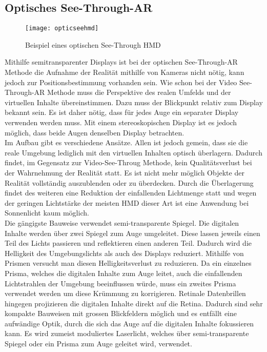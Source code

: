 \subsection*{Optisches See-Through-AR}
\begin{wrapfigure}{r}{0.35\textwidth}
	\vspace{-20pt}
	\begin{center}
		\texttt{[image: opticseehmd]}
	\end{center}
	\vspace{-15pt}
	\captionsetup{width=0.3\textwidth}
	\caption{Beispiel eines optischen See-Through HMD}\label{optseehmd}
	\vspace{-10pt}
\end{wrapfigure}
Mithilfe semitransparenter Displays ist bei der optischen See-Through-AR Methode die Aufnahme der Realität mithilfe von Kameras nicht nötig, kann jedoch zur Positionsbestimmung vorhanden sein. Wie schon bei der Video See-Through-AR Methode muss die Perspektive des realen Umfelds und der virtuellen Inhalte übereinstimmen. Dazu muss der Blickpunkt relativ zum Display bekannt sein. Es ist daher nötig, dass für jedes Auge ein separater Display verwenden werden muss. Mit einem stereoskopischen Display ist es jedoch möglich, dass beide Augen denselben Display betrachten.\cite[S.~248~f.]{doerner13}\\[6pt]
Im Aufbau gibt es verschiedene Ansätze. Allen ist jedoch gemein, dass sie die reale Umgebung lediglich mit den virtuellen Inhalten optisch überlagern. Dadurch findet, im Gegensatz zur Video-See-Throug Methode, kein Qualitätsverlust bei der Wahrnehmung der Realität statt. Es ist nicht mehr möglich Objekte der Realität vollständig auszublenden oder zu überdecken. Durch die Überlagerung findet des weiteren eine Reduktion der einfallenden Lichtmenge statt und wegen der geringen Lichtstärke der meisten HMD dieser Art ist eine Anwendung bei Sonnenlicht kaum möglich.\\[6pt]
Die gängigste Bauweise verwendet semi-transparente Spiegel. Die digitalen Inhalte werden über zwei Spiegel zum Auge umgeleitet. Diese lassen jeweils einen Teil des Lichts passieren und reflektieren einen anderen Teil. Dadurch wird die Helligkeit des Umgebungslichts als auch des Displays reduziert. Mithilfe von Prismen versucht man diesen Helligkeitsverlust zu reduzieren. Da ein einzelnes Prisma, welches die digitalen Inhalte zum Auge leitet, auch die einfallenden Lichtstrahlen der Umgebung beeinflussen würde, muss ein zweites Prisma verwendet werden um diese Krümmung zu korrigieren. Retinale Datenbrillen hingegen projizieren die digitalen Inhalte direkt auf die Retina. Dadurch sind sehr kompakte Bauweisen mit grossen Blickfeldern möglich und es entfällt eine aufwändige Optik, durch die sich das Auge auf die digitalen Inhalte fokussieren kann. Es wird zumeist moduliertes Laserlicht, welches über semi-transparente Spiegel oder ein Prisma zum Auge geleitet wird, verwendet.\\[6pt]

